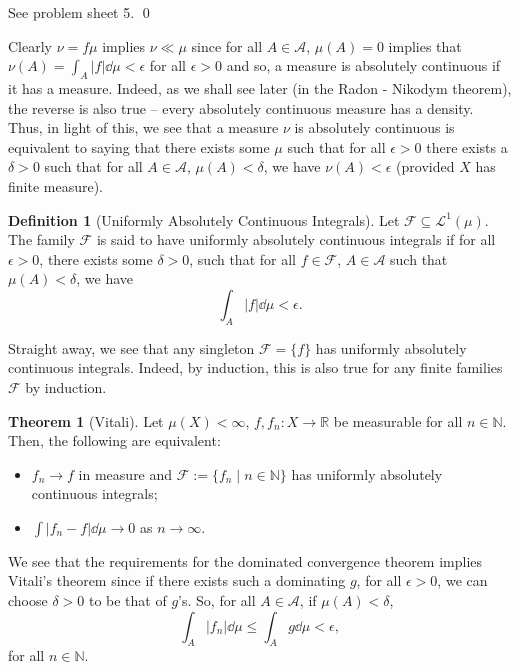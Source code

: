\documentclass[
]{article}
\theoremstyle{definition}
\newtheorem{theorem}{Theorem}
\theoremstyle{definition}
\newtheorem{definition}{Definition}[section]
\begin{document}
See problem sheet 5. \qed

Clearly \(\nu = f\mu\) implies \(\nu \ll \mu\) since for all
\(A \in \mathcal{A}\), \(\mu(A) = 0\) implies that
\(\nu (A) = \int_A |f| \dd \mu < \epsilon\) for all \(\epsilon > 0\) and
so, a measure is absolutely continuous if it has a measure. Indeed, as
we shall see later (in the Radon - Nikodym theorem), the reverse is also
true -- every absolutely continuous measure has a density. Thus, in
light of this, we see that a measure \(\nu\) is absolutely continuous is
equivalent to saying that there exists some \(\mu\) such that for all
\(\epsilon > 0\) there exists a \(\delta > 0\) such that for all
\(A \in \mathcal{A}\), \(\mu(A) < \delta\), we have
\(\nu(A) < \epsilon\) (provided \(X\) has finite measure).

\begin{definition}[Uniformly Absolutely Continuous Integrals]
  Let \(\mathcal{F} \subseteq \mathcal{L}^1(\mu)\). The family \(\mathcal{F}\) is 
  said to have uniformly absolutely continuous integrals if for all \(\epsilon > 0\), 
  there exists some \(\delta > 0\), such that for all \(f \in \mathcal{F}\), 
  \(A \in \mathcal{A}\) such that \(\mu(A) < \delta\), we have 
  \[\int_A |f| \dd \mu < \epsilon.\]
\end{definition}

Straight away, we see that any singleton \(\mathcal{F} = \{f\}\) has
uniformly absolutely continuous integrals. Indeed, by induction, this is
also true for any finite families \(\mathcal{F}\) by induction.

\begin{theorem}[Vitali]
  Let \(\mu(X) < \infty\), \(f, f_n : X \to \mathbb{R}\) be measurable for all 
  \(n \in \mathbb{N}\). Then, the following are equivalent:
  \begin{itemize}
    \item \(f_n \to f\) in measure and \(\mathcal{F} := \{f_n \mid n \in \mathbb{N}\}\) 
      has uniformly absolutely continuous integrals;
    \item \(\int |f_n - f| \dd \mu \to 0\) as \(n \to \infty\).
  \end{itemize}
\end{theorem}

We see that the requirements for the dominated convergence theorem
implies Vitali's theorem since if there exists such a dominating \(g\),
for all \(\epsilon > 0\), we can choose \(\delta > 0\) to be that of
\(g\)'s. So, for all \(A \in \mathcal{A}\), if \(\mu(A) < \delta\),
\[\int_A |f_n| \dd \mu \le \int_A g \dd \mu < \epsilon,\] for all
\(n \in \mathbb{N}\).
\end{document}
